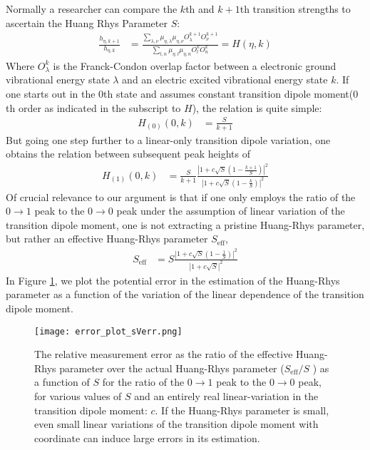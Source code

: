 Normally a researcher can compare the $k$th and $k+1$th transition strengths to ascertain the Huang Rhys Parameter $S$:
\begin{align}
	\frac{h_{\eta,k+1}}{h_{\eta,k}} &=  \frac{\sum_{\lambda,\nu} \mu_{\eta,\lambda}\mu_{\eta,\nu}   O_{\lambda}^{k+1} O_{\nu}^{k+1} }{\sum_{l,n} \mu_{\eta,l}\mu_{\eta,n}   O_{l}^{k} O_{n}^{k} } = H(\eta,k)
	\label{eqn:HDef}
\end{align}
Where $O_{\lambda}^{k}$ is the Franck-Condon overlap factor between a electronic ground vibrational energy state $\lambda$ and an electric excited vibrational energy state $k$.  If one starts out in the 0th state and assumes constant transition dipole moment($0$th order as indicated in the subscript to $H$), the relation is quite simple:
\begin{align}
	H_{(0)}(0, k)	&= \frac{S }{k+1 }
\end{align}
But going one step further to a linear-only transition dipole variation, one obtains the relation between subsequent peak heights of
\begin{align}
	H_{(1)}(0, k)	&=  \frac{S }{k+1 } \frac{\left| 1 + c\sqrt{S} \left( 1  - \frac{k+1}{S} \right) \right|^2}{\left| 1 + c \sqrt{S} \left( 1  - \frac{k}{S} \right)\right|^2 }
\end{align}
Of crucial relevance to our argument is that if one only employs the ratio of the $0 \rightarrow 1$ peak to the $0 \rightarrow 0$ peak under the assumption of linear variation of the transition dipole moment, one is not extracting a pristine Huang-Rhys parameter, but rather an effective Huang-Rhys parameter $S_{\text{eff}}$,
\begin{align}
	S_{\text{eff}}	&=  S \frac{\left| 1 + c \sqrt{S} \left( 1  - \frac{1}{S} \right) \right|^2}{\left| 1 + c \sqrt{S} \right|^2 }
\end{align}
In Figure \ref{fig:absorpstion_HRF_error_sVerr}, we plot the potential error in the estimation of the Huang-Rhys parameter as a function of the variation of the linear dependence of the transition dipole moment.
\begin{figure}
   \texttt{[image: error\_plot\_sVerr.png]}
   \caption{The relative measurement error as the ratio of the effective Huang-Rhys parameter over the actual Huang-Rhys parameter ($S_{\text{eff}} / S $ ) as a function of $S$ for the ratio of the $0\rightarrow1$ peak to the $0\rightarrow0$ peak, for various values of $S$ and an entirely real linear-variation in the transition dipole moment: $c$.  If the Huang-Rhys parameter is small, even small linear variations of the transition dipole moment with coordinate can induce large errors in its estimation.}
	\label{fig:absorpstion_HRF_error_sVerr}
\end{figure}

